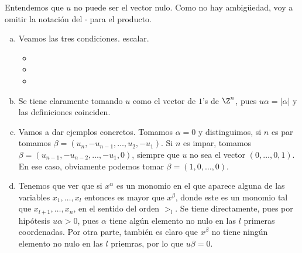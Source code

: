 \documentclass[twoside]{article}
\begin{document}
\begin{solucion}
Entendemos que $u$ no puede ser el vector nulo.  Como no hay ambigüedad, voy a omitir la notación del $\cdot$ para el producto. 
\begin{enumerate}[a.]
\item Veamos las tres condiciones. escalar.
\begin{itemize}
\item 
\item 
\item
\end{itemize}
\item Se tiene claramente tomando $u$ como el vector de $1$'s de $\Z^n$, pues $u\alpha=|\alpha|$ y las definiciones coinciden.
\item Vamos a dar ejemplos concretos. Tomamos $\alpha=0$ y distinguimos, si $n$ es par tomamos $\beta=(u_n,-u_{n-1},\dotsc,u_2,-u_1)$. Si $n$ es impar, tomamos $\beta=(u_{n-1},-u_{n-2},\dotsc,-u_1,0)$, siempre que $u$ no sea el vector $(0,\dotsc,0,1)$. En ese caso, obviamente podemos tomar $\beta=(1,0,\dotsc,0)$.
\item Tenemos que ver que si $x^\alpha$ es un monomio en el que aparece alguna de las variables $x_1,\dotsc,x_l$ entonces es mayor que $x^\beta$, donde este es un monomio tal que $x_{l+1},\dotsc,x_n$, en el sentido del orden $>_l$. Se tiene directamente, pues por hipótesis $u \alpha >0$, pues $\alpha$ tiene algún elemento no nulo en las $l$ primeras coordenadas. Por otra parte, también es claro que $x^\beta$ no tiene ningún elemento no nulo en las $l$ priemras, por lo que $u\beta =0$. 
\end{enumerate}
\end{solucion}
\end{document}
